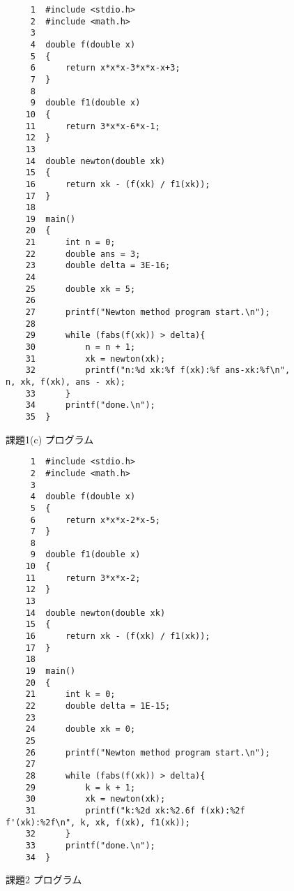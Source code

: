 \documentclass[12pt]{jarticle}
\begin{document}
\begin{figure}[t]
\begin{screen}
\footnotesize
\begin{verbatim}
     1	#include <stdio.h>
     2	#include <math.h> 
     3	
     4	double f(double x)
     5	{
     6	    return x*x*x-3*x*x-x+3;
     7	}
     8	
     9	double f1(double x)
    10	{
    11	    return 3*x*x-6*x-1;
    12	}
    13	
    14	double newton(double xk)
    15	{
    16	    return xk - (f(xk) / f1(xk));
    17	}
    18	
    19	main()
    20	{
    21	    int n = 0;
    22	    double ans = 3;
    23	    double delta = 3E-16;
    24	
    25	    double xk = 5;
    26	
    27	    printf("Newton method program start.\n");
    28	
    29	    while (fabs(f(xk)) > delta){
    30	        n = n + 1;
    31	        xk = newton(xk);
    32	        printf("n:%d xk:%f f(xk):%f ans-xk:%f\n", n, xk, f(xk), ans - xk);
    33	    }
    34	    printf("done.\n");
    35	}
\end{verbatim}
\end{screen}
\caption{課題1(c) プログラム}
\label{fig:p1c}
\end{figure}

\begin{figure}[t]
\begin{screen}
\footnotesize
\begin{verbatim}
     1	#include <stdio.h>
     2	#include <math.h> 
     3	
     4	double f(double x)
     5	{
     6	    return x*x*x-2*x-5;
     7	}
     8	
     9	double f1(double x)
    10	{
    11	    return 3*x*x-2;
    12	}
    13	
    14	double newton(double xk)
    15	{
    16	    return xk - (f(xk) / f1(xk));
    17	}
    18	
    19	main()
    20	{
    21	    int k = 0;
    22	    double delta = 1E-15;
    23	
    24	    double xk = 0;
    25	
    26	    printf("Newton method program start.\n");
    27	
    28	    while (fabs(f(xk)) > delta){
    29	        k = k + 1;
    30	        xk = newton(xk);
    31	        printf("k:%2d xk:%2.6f f(xk):%2f f'(xk):%2f\n", k, xk, f(xk), f1(xk));
    32	    }
    33	    printf("done.\n");
    34	}
\end{verbatim}
\end{screen}
\caption{課題2 プログラム}
\label{fig:p2}
\end{figure}
\end{document}
